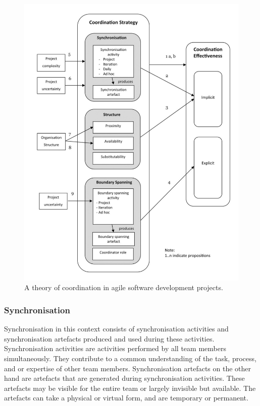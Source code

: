 \begin{figure}
\centering
\includegraphics[width=160mm]{images/Strode.pdf}
\caption{A theory of coordination in agile software development projects.}
\label{strode}
\end{figure}

\subsubsection{Synchronisation}

Synchronisation in this context consists of synchronisation activities and synchronisation artefacts produced and used during these activities. Synchronisation activities are activities performed by all team members simultaneously. They contribute to a common understanding of the task, process, and or expertise of other team members. Synchronisation artefacts on the other hand are artefacts that are generated during synchronisation activities. These artefacts may be visible for the entire team or largely invisible but available. The artefacts can take a physical or virtual form, and are temporary or permanent.

